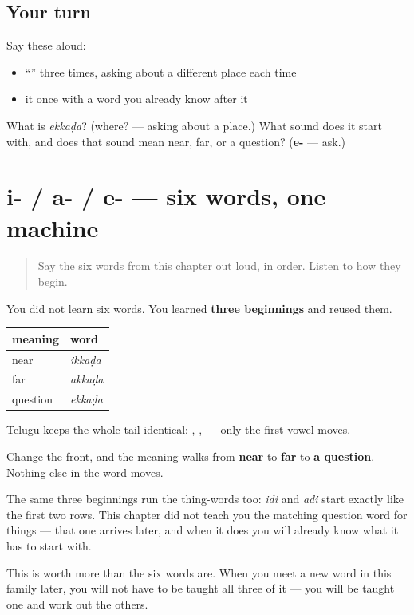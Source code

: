 \subsection*{Your turn}
Say these aloud:

\begin{itemize}
\raggedright
  \item \textquotedblleft{}\textquotedblright{} three times, asking about a different place each time
  \item it once with a word you already know after it
\end{itemize}

\begin{tcolorbox}[breakable,colback=teal!4,colframe=teal!35!black,title={Before you move on}]
What is \emph{ekkaḍa}? (where? — asking about a place.) What sound does it start with, and does that sound mean near, far, or a question? (\textbf{e-} — ask.)
\end{tcolorbox}
\section[i- / a- / e-]{i- / a- / e- — six words, one machine}

\label{lesson:TE-C41-deixis-system}



\begin{quote}
Say the six words from this chapter out loud, in order. Listen to how they begin.
\end{quote}

\begin{grammarlens}[title={Grammar lens: one slot changes}]
You did not learn six words. You learned \textbf{three beginnings} and reused them.

\noindent
\begin{tabularx}{\linewidth}{@{}>{\raggedright\arraybackslash}X>{\raggedright\arraybackslash}X@{}}
\toprule
\textbf{meaning} & \textbf{word} \\
\midrule
near & \textbf{\te{ఇక్కడ}} \emph{ikkaḍa} \\
far & \textbf{\te{అక్కడ}} \emph{akkaḍa} \\
question & \textbf{\te{ఎక్కడ}} \emph{ekkaḍa} \\
\bottomrule
\end{tabularx}

Telugu keeps the whole tail identical: , ,  — only the first vowel moves.

Change the front, and the meaning walks from \textbf{near} to \textbf{far} to \textbf{a question}. Nothing else in the word moves.

The same three beginnings run the thing-words too: \textbf{} \emph{idi} and \textbf{} \emph{adi} start exactly like the first two rows. This chapter did not teach you the matching question word for things — that one arrives later, and when it does you will already know what it has to start with.

This is worth more than the six words are. When you meet a new word in this family later, you will not have to be taught all three of it — you will be taught one and work out the others.
\end{grammarlens}

